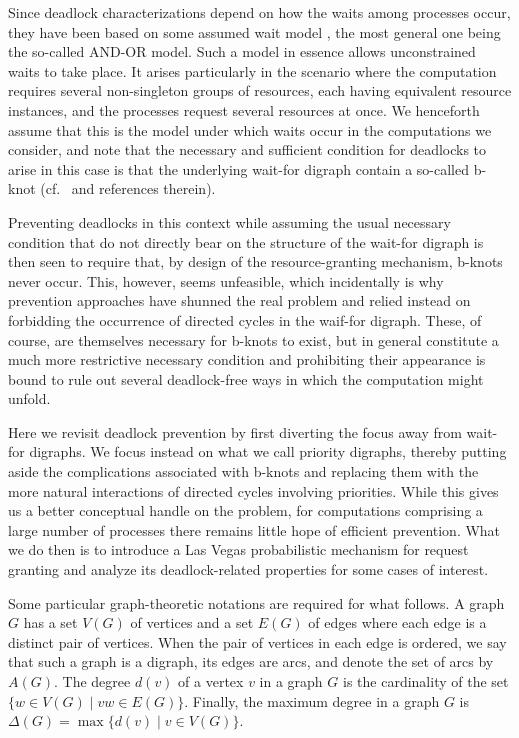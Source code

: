 \documentclass{article}
\newcommand{\set}[1][ ]{\{ #1 \}}
\begin{document}
Since deadlock characterizations depend on how the waits among processes occur,
they have been based on some assumed wait model
\cite{MisraChandy, BrachaToueg, KshemkalyaniSinghal, RyangPark, BrzezinskiHelaryRaynalSinghal, Barbosa99thecombinatorics},
the most general one being the so-called AND-OR model. Such a model in essence
allows unconstrained waits to take place. It arises particularly in the scenario
where the computation requires several non-singleton groups of resources, each
having equivalent resource instances, and the processes request several
resources at once. We henceforth assume that this is the model under which waits
occur in the computations we consider, and note that the necessary and
sufficient condition for deadlocks to arise in this case is that the underlying
wait-for digraph contain a so-called b-knot
(cf.~\cite{Barbosa99thecombinatorics} and references therein). 

Preventing deadlocks in this context while assuming the usual necessary
condition that do not directly bear on the structure of the wait-for digraph is
then seen to require that, by design of the resource-granting mechanism, b-knots
never occur. This, however, seems unfeasible, which incidentally is why
prevention approaches have shunned the real problem and relied instead on
forbidding the occurrence of directed cycles in the waif-for digraph. These, of
course, are themselves necessary for b-knots to exist, but in general constitute
a much more restrictive necessary condition and prohibiting their appearance is
bound to rule out several deadlock-free ways in which the computation might
unfold. 

Here we revisit deadlock prevention by first diverting the focus away from
wait-for digraphs. We focus instead on what we call priority digraphs, thereby
putting aside the complications associated with b-knots and replacing them with
the more natural interactions of directed cycles involving priorities. While
this gives us a better conceptual handle on the problem, for computations
comprising a large number of processes there remains little hope of efficient
prevention. What we do then is to introduce a Las Vegas probabilistic mechanism
for request granting and analyze its deadlock-related properties for some cases
of interest.

Some particular graph-theoretic notations are required for what follows. A graph
$G$ has a set $V(G)$ of vertices and a set $E(G)$ of edges where each edge is a
distinct pair of vertices. When the pair of vertices in each edge is ordered, we
say that such a graph is a digraph, its edges are arcs, and denote the set of
arcs by $A(G)$. The degree $d(v)$ of a vertex $v$ in a graph $G$ is the
cardinality of the set $\set[w \in V(G) \;|\; vw \in E(G)]$. Finally, the
maximum degree in a graph $G$ is
$\Delta(G) = \max \set[ d(v) \;|\; v \in V(G) ]$. 
\end{document}
